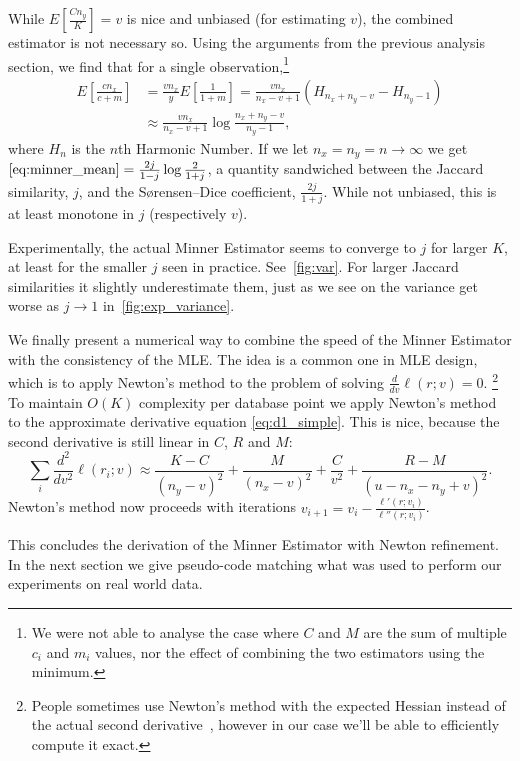 \hspace{.2em}

While $E[\frac{C n_y}{K}] = v$ is nice and unbiased (for estimating $v$), the combined estimator is not necessary so.
Using the arguments from the previous analysis section, we find that for a single observation,\footnote{We were not able to analyse the case where $C$ and $M$ are the sum of multiple $c_i$ and $m_i$ values, nor the effect of combining the two estimators using the minimum.}
\begin{align}
   E[\frac{c n_x}{c+m}]
   &= \frac{v n_x}{y} E[\frac{1}{1+m}]
   = \frac{v n_x}{n_x-v+1} (H_{n_x+n_y-v} - H_{n_y-1})
 \\&\approx \frac{v n_x}{n_x-v+1} \log\frac{n_x+n_y-v}{n_y-1},
 \label{eq:minner_mean}
\end{align}
where $H_n$ is the $n$th Harmonic Number.
If we let $n_x=n_y=n\to \infty$ we get $\eqref{eq:minner_mean} = \frac{2j}{1-j}\log\frac{2}{1+j}$, a quantity sandwiched between the Jaccard similarity, $j$, and the Sørensen–Dice coefficient, $\frac{2j}{1+j}$.
While not unbiased, this is at least monotone in $j$ (respectively $v$).

Experimentally, the actual Minner Estimator seems to converge to $j$ for larger $K$, at least for the smaller $j$ seen in practice. See~\cref{fig:var}.
For larger Jaccard similarities it slightly underestimate them, just as we see on the variance get worse as $j\to1$ in~\cref{fig:exp_variance}.

\hspace{.2em}

We finally present a numerical way to combine the speed of the Minner Estimator with the consistency of the MLE.
The idea is a common one in MLE design, which is to apply Newton's method to the problem of solving $\frac{d}{dv}\ell(r;v)=0$.%
\footnote{People sometimes use Newton's method with the expected Hessian instead of the actual second derivative~\cite{longford1987fast}, however in our case we'll be able to efficiently compute it exact.}
To maintain $O(K)$ complexity per database point we apply Newton's method to the approximate derivative equation \cref{eq:d1_simple}.
This is nice, because the second derivative is still linear in $C$, $R$ and $M$:
\[
   \sum_i\frac{d^2}{dv^2}\ell(r_i; v) \approx
   \frac{K-C}{(n_y-v)^2} 
   +\frac{M}{(n_x-v)^2} 
   +\frac{C}{v^2}
   +\frac{R-M}{(u-n_x-n_y+v)^2}
   .
   \label{eq:d2_simple}
\]
Newton's method now proceeds with iterations
$v_{i+1} = v_i - \frac{\ell'(r; v_i)}{\ell''(r; v_i)}$.

This concludes the derivation of the Minner Estimator with Newton refinement.
In the next section we give pseudo-code matching what was used to perform our experiments on real world data.

